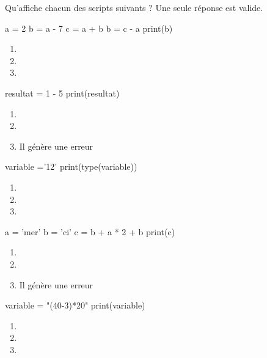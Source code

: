 \documentclass[a4paper,10pt]{article}
\begin{document}
Qu'affiche chacun des scripts suivants ? Une seule réponse est valide.
\begin{multicols}{2}

\begin{pythoncode}
a = 2
b = a - 7
c = a + b
b = c - a
print(b)
\end{pythoncode}
\begin{enumerate}[\case\ \ a.]
\item {}
\item {}
\item {}
\end{enumerate}




\begin{pythoncode}
resultat = 1 - 5 %
print(resultat)
\end{pythoncode}

\begin{enumerate}[\case\ \ a.]
\item {}
\item {}
\item Il génère une erreur
\end{enumerate}


\begin{pythoncode}
variable ='12'
print(type(variable))
\end{pythoncode}
\begin{enumerate}[\case\ \ a.]
\item    {}
\item    {}
\item    {}
\end{enumerate}
\columnbreak

\begin{pythoncode}
a = 'mer'
b = 'ci'
c = b + a * 2 + b
print(c)
\end{pythoncode}
\begin{enumerate}[\case\ \ a.]
\item    {}
\item    {}
\item    Il génère une erreur
\end{enumerate}


\begin{pythoncode}
variable = "(40-3)*20"
print(variable)
\end{pythoncode}
\begin{enumerate}[\case\ \ a.]
\item    {}
\item    {}
\item    {}
\end{enumerate}



\end{multicols}
\end{document}
